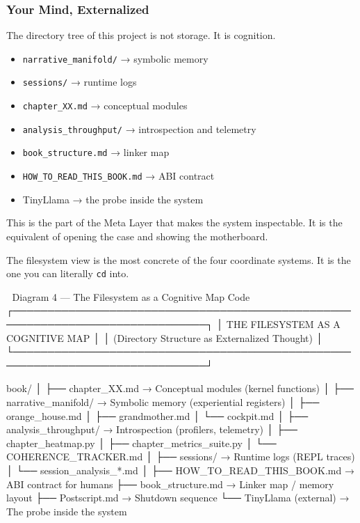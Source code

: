 \documentclass[
]{article}
\providecommand{\tightlist}{%
  \setlength{\itemsep}{0pt}\setlength{\parskip}{0pt}}
\begin{document}
\hypertarget{your-mind-externalized}{%
\subsubsection{Your Mind, Externalized}\label{your-mind-externalized}}

The directory tree of this project is not storage. It is cognition.

\begin{itemize}
\tightlist
\item
  \texttt{narrative\_manifold/} → symbolic memory
\item
  \texttt{sessions/} → runtime logs
\item
  \texttt{chapter\_XX.md} → conceptual modules
\item
  \texttt{analysis\_throughput/} → introspection and telemetry
\item
  \texttt{book\_structure.md} → linker map
\item
  \texttt{HOW\_TO\_READ\_THIS\_BOOK.md} → ABI contract
\item
  TinyLlama → the probe inside the system
\end{itemize}

This is the part of the Meta Layer that makes the system inspectable. It
is the equivalent of opening the case and showing the motherboard.

The filesystem view is the most concrete of the four coordinate systems.
It is the one you can literally \texttt{cd} into.

📁 Diagram 4 --- The Filesystem as a Cognitive Map Code
┌──────────────────────────────────────────────────────────────────────────────┐
│ THE FILESYSTEM AS A COGNITIVE MAP │ │ (Directory Structure as
Externalized Thought) │
└──────────────────────────────────────────────────────────────────────────────┘

book/ │ ├── chapter\_XX.md → Conceptual modules (kernel functions) │ ├──
narrative\_manifold/ → Symbolic memory (experiential registers) │ ├──
orange\_house.md │ ├── grandmother.md │ └── cockpit.md │ ├──
analysis\_throughput/ → Introspection (profilers, telemetry) │ ├──
chapter\_heatmap.py │ ├── chapter\_metrics\_suite.py │ └──
COHERENCE\_TRACKER.md │ ├── sessions/ → Runtime logs (REPL traces) │ └──
session\_analysis\_*.md │ ├── HOW\_TO\_READ\_THIS\_BOOK.md → ABI
contract for humans ├── book\_structure.md → Linker map / memory layout
├── Postscript.md → Shutdown sequence └── TinyLlama (external) → The
probe inside the system
\end{document}
